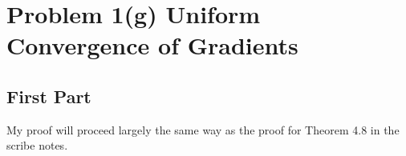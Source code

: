 \documentclass[11pt]{article}
\newcommand{\1}{\mathbb{I}} %
\begin{document}
\clearpage 
\section*{Problem 1(g) Uniform Convergence of Gradients}

\subsection*{First Part} 


My proof will proceed largely the same way as the proof for Theorem 4.8 in the scribe notes. 
\end{document}
